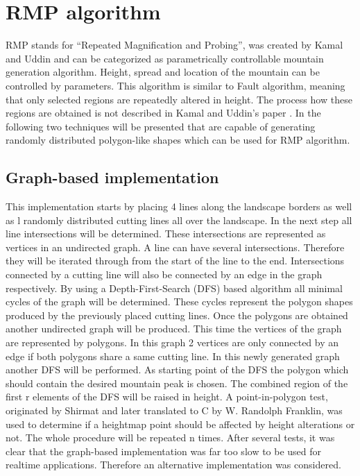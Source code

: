 \documentclass[11pt,a4paper,twoside,openright]{report}
\begin{document}
\section{RMP algorithm}
RMP stands for ``Repeated Magnification and Probing'', was created by Kamal and Uddin \cite{Kamal:2007:PCT:1321261.1321264} and can be categorized as parametrically controllable mountain generation algorithm. Height, spread and location of the mountain can be controlled by parameters. This algorithm is similar to Fault algorithm, meaning that only selected regions are repeatedly altered in height. The process how these regions are obtained is not described in Kamal and Uddin's paper \cite{Kamal:2007:PCT:1321261.1321264}. In the following two techniques will be presented that are capable of generating randomly distributed polygon-like shapes which can be used for RMP algorithm.

\subsection{Graph-based implementation}
This implementation starts by placing 4 lines along the landscape borders as well as l randomly distributed cutting lines all over the landscape. In the next step all line intersections will be determined. These intersections are represented as vertices in an undirected graph. A line can have several intersections. Therefore they will be iterated through from the start of the line to the end. Intersections connected by a cutting line will also be connected by an edge in the graph respectively. By using a Depth-First-Search (DFS) based algorithm all minimal cycles of the graph will be determined. These cycles represent the polygon shapes produced by the previously placed cutting lines. Once the polygons are obtained another undirected graph will be produced. This time the vertices of the graph are represented by polygons. In this graph 2 vertices are only connected by an edge if both polygons share a same cutting line. In this newly generated graph another DFS will be performed. As starting point of the DFS the polygon which should contain the desired mountain peak is chosen. The combined region of the first r elements of the DFS will be raised in height. A point-in-polygon test, originated by Shirmat \cite{Shimrat:1962:APP:368637.368653} and later translated to C by W. Randolph Franklin, was used to determine if a heightmap point should be affected by height alterations or not. The whole procedure will be repeated n times. After several tests, it was clear that the graph-based implementation was far too slow to be used for realtime applications. Therefore an alternative implementation was considered.
\end{document}
